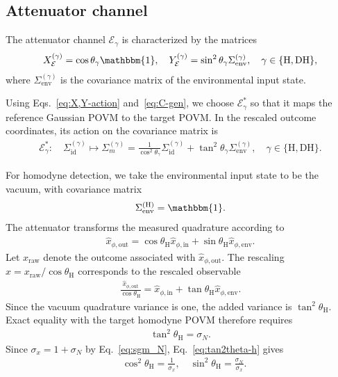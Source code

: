 \documentclass[%
final, 
superscriptaddress,
 amsmath,amssymb,amsfonts,
 aps,
 pra,
 longbibliography,
]{revtex4-2}
\newcommand{\ind}[1]{\mathrm{#1}}
\begin{document}
\subsection{Attenuator channel}
The attenuator channel $\mathcal{E}_{\gamma}$ is characterized by the matrices~\cite{Serafini:bk:2023}
\begin{align}
    \label{eq:X,Y}
    X_{\mathcal{E}}^{(\gamma)}=\cos\theta_{\gamma}\mathbbm{1}, \quad Y_{\mathcal{E}}^{(\gamma)}=\sin^2\theta_{\gamma}\Sigma_{\ind{env}}^{(\gamma)}, \quad \gamma \in \{\ind{H}, \ind{DH}\},
\end{align}
where $\Sigma_{\ind{env}}^{(\gamma)}$ is the covariance matrix of the environmental input state.

Using Eqs.~\eqref{eq:X,Y-action} and~\eqref{eq:C-gen}, we choose $\mathcal{E}_{\gamma}^{*}$ so that it maps the reference Gaussian POVM to the target POVM. In the rescaled outcome coordinates, its action on the covariance matrix is
\begin{align}
    \label{eq:psi_ast}
    \mathcal{E}_{\gamma}^{*}:\quad \Sigma_{\ind{id}}^{(\gamma)}\mapsto\Sigma_{m}^{(\gamma)}=\frac{1}{\cos^2\theta_{\gamma}}\Sigma_{\ind{id}}^{(\gamma)}+\tan^2\theta_{\gamma}\Sigma_{\ind{env}}^{(\gamma)},
    \quad \gamma\in\{\ind{H},\ind{DH}\}.
\end{align}

For homodyne detection, we take the environmental input state to be the vacuum, with covariance matrix
\begin{align}
    \label{eq:sigma-anc-h}
    \Sigma_{\ind{env}}^{(\ind{H})}=\mathbbm{1}.
\end{align}
The attenuator transforms the measured quadrature according to
\begin{align}
  \hat{x}_{\phi,\ind{out}}
  =\cos\theta_{\ind{H}}\hat{x}_{\phi,\ind{in}}
  +\sin\theta_{\ind{H}}\hat{x}_{\phi,\ind{env}}.
\end{align}
Let $x_{\ind{raw}}$ denote the outcome associated with $\hat{x}_{\phi,\ind{out}}$. The rescaling $x=x_{\ind{raw}}/\cos\theta_{\ind{H}}$ corresponds to the rescaled observable
\begin{align}
  \frac{\hat{x}_{\phi,\ind{out}}}{\cos\theta_{\ind{H}}}
  =\hat{x}_{\phi,\ind{in}}
  +\tan\theta_{\ind{H}}\hat{x}_{\phi,\ind{env}}.
\end{align}
Since the vacuum quadrature variance is one, the added variance is $\tan^2\theta_{\ind{H}}$. Exact equality with the target homodyne POVM therefore requires
\begin{align}
  \label{eq:tan2theta-h}
  \tan^2\theta_{\ind{H}}=\sigma_N. %
\end{align}
Since $\sigma_x=1+\sigma_N$ by Eq.~\eqref{eq:sgm_N}, Eq.~\eqref{eq:tan2theta-h} gives
\begin{align}
    \label{eq:cos-theta-h}
    &\cos^2\theta_{\ind{H}}={\frac{1}{\sigma_x}},\quad
    \sin^2\theta_{\ind{H}}={\frac{\sigma_N}{\sigma_x}}.
\end{align}
\end{document}
